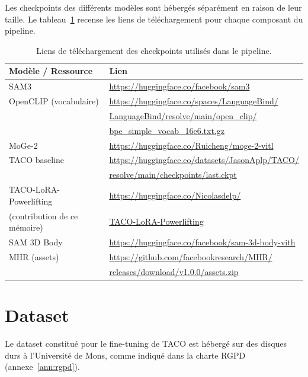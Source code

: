 Les checkpoints des différents modèles sont hébergés séparément en raison de leur taille. Le tableau~\ref{tab:checkpoints} recense les liens de téléchargement pour chaque composant du pipeline.

\begin{table}[h]
  \centering
  \small
  \begin{tabular}{ll}
    \hline
    \textbf{Modèle / Ressource} & \textbf{Lien} \\
    \hline
    SAM3 & \url{https://huggingface.co/facebook/sam3} \\
    OpenCLIP (vocabulaire) & \url{https://huggingface.co/spaces/LanguageBind/} \\
                           & \url{LanguageBind/resolve/main/open_clip/} \\
                           & \url{bpe_simple_vocab_16e6.txt.gz} \\
    MoGe-2 & \url{https://huggingface.co/Ruicheng/moge-2-vitl} \\
    TACO baseline & \url{https://huggingface.co/datasets/JasonAplp/TACO/} \\
                  & \url{resolve/main/checkpoints/last.ckpt} \\
    TACO-LoRA-Powerlifting & \url{https://huggingface.co/Nicolasdelp/} \\
    (contribution de ce mémoire) & \url{TACO-LoRA-Powerlifting} \\
    SAM 3D Body & \url{https://huggingface.co/facebook/sam-3d-body-vith} \\
    MHR (assets) & \url{https://github.com/facebookresearch/MHR/} \\
                 & \url{releases/download/v1.0.0/assets.zip} \\
    \hline
  \end{tabular}
  \caption{Liens de téléchargement des checkpoints utilisés dans le pipeline.}
  \label{tab:checkpoints}
\end{table}

\section*{Dataset}

Le dataset constitué pour le fine-tuning de TACO est hébergé sur des disques durs à l'Université de Mons, comme indiqué dans la charte RGPD (annexe~\ref{ann:rgpd}).